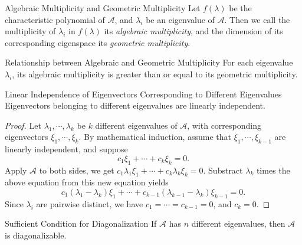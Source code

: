 \begin{definition}{Algebraic Multiplicity and Geometric Multiplicity}{}
  Let $f(\lambda)$ be the characteristic polynomial of $\mathcal{A}$,
  and $\lambda_i$ be an eigenvalue of $\mathcal{A}$.
  Then we call the multiplicity of $\lambda_i$ in $f(\lambda)$ its
  \emph{algebraic multiplicity},
  and the dimension of its corresponding eigenspace its \emph{geometric multiplicity}.
\end{definition}

\begin{lemma}{Relationship between Algebraic and Geometric Multiplicity}{}
  For each eigenvalue $\lambda_i$,
  its algebraic multiplicity is greater than or equal to its geometric multiplicity.
\end{lemma}

\begin{proposition}{Linear Independence of Eigenvectors Corresponding to
    Different Eigenvalues}{}
  Eigenvectors belonging to different eigenvalues are linearly independent.
\end{proposition}

\begin{proof}
  Let $\lambda_1,\cdots,\lambda_k$ be $k$ different eigenvalues of
  $\mathcal{A}$,
  with corresponding eigenvectors $\xi_1,\cdots,\xi_k$.
  By mathematical induction, assume that $\xi_1,\cdots,\xi_{k-1}$ are linearly
  independent,
  and suppose
  \begin{equation}
    c_1\xi_1 + \cdots + c_k\xi_k = 0.
  \end{equation}
  Apply $\mathcal{A}$ to both sides, we get $c_1\lambda_1\xi_1 + \cdots +
  c_k\lambda_k\xi_k = 0$.
  Substract $\lambda_k$ times the above equation from this new equation yields
  \begin{equation}
    c_1(\lambda_1 - \lambda_k)\xi_1 + \cdots + c_{k-1}(\lambda_{k-1} - \lambda_k)\xi_{k-1} = 0.
  \end{equation}
  Since $\lambda_i$ are pairwise distinct,
  we have $c_1 = \cdots = c_{k-1} = 0$,
  and $c_k = 0$.
\end{proof}

\begin{proposition}{Sufficient Condition for Diagonalization}{}
  If $\mathcal{A}$ has $n$ different eigenvalues,
  then $\mathcal{A}$ is diagonalizable.
\end{proposition}

